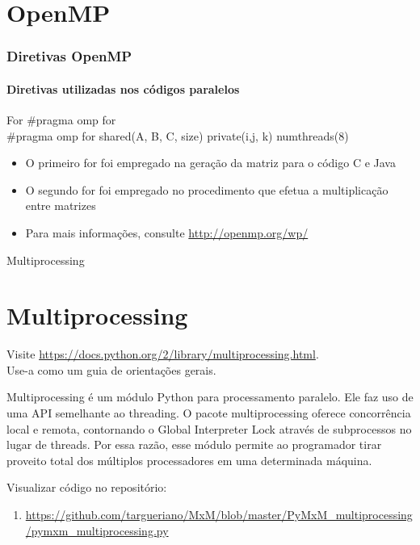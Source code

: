 \documentclass[aspectratio=169]{beamer}
\begin{document}
\section{OpenMP}
\begin{frame}
\frametitle{Diretivas OpenMP}
\framesubtitle{Diretivas utilizadas nos códigos paralelos}

\begin{block}{For}
  \#pragma omp for\\
  \#pragma omp for shared(A, B, C, size) private(i,j, k) num\underline{\hspace{.10in}}threads(8)
\end{block}

\begin{itemize}
 \item O primeiro for foi empregado na geração da matriz para o código C e Java\pause
 
 \item O segundo for foi empregado no procedimento que efetua a multiplicação entre matrizes \pause
 
 \item Para mais informações, consulte 
 \url{http://openmp.org/wp/}
 
\end{itemize}

\end{frame}

\begin{frame}{Multiprocessing}
\section{Multiprocessing}
Visite \url{https://docs.python.org/2/library/multiprocessing.html}.\\ 
Use-a como um guia de orientações gerais.
\vspace{0.7cm}

Multiprocessing é um módulo Python para processamento paralelo. Ele faz uso de uma API semelhante ao threading. 
O pacote multiprocessing oferece concorrência local e remota, contornando o Global Interpreter Lock através de subprocessos no lugar de threads. Por essa razão, esse módulo permite ao programador tirar proveito total dos múltiplos processadores em uma determinada máquina.

Visualizar código no repositório:
\begin{enumerate}
 \item \url{https://github.com/targueriano/MxM/blob/master/PyMxM_multiprocessing/pymxm_multiprocessing.py}
\end{enumerate}

\end{frame}
\end{document}
